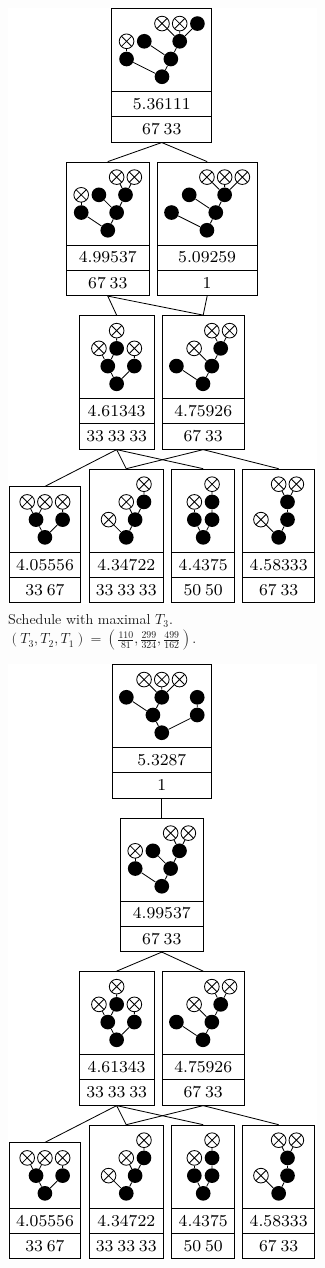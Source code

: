 \begin{figure}[ht]
\begin{subfigure}{.3\linewidth}
    \includegraphics{p3/max_p3_min_p1/00112333t3max.pdf}
    \caption{Schedule with maximal $T_3$. $(T_3,T_2,T_1)=(\frac{110}{81},\frac{299}{324},\frac{499}{162})$.}
  \end{subfigure}
  \quad
  \begin{subfigure}{.3\linewidth}
    \centering
    \includegraphics{p3/max_p3_min_p1/00112333opt.pdf}

\end{subfigure}
\end{figure}
